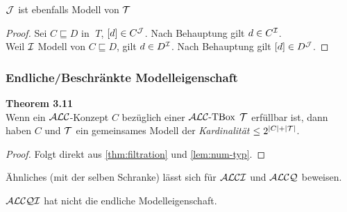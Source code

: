 \begin{tafel}
$\mathcal{J}$ ist ebenfalls Modell von $\mathcal{T}$
\begin{proof}
Sei $C \sqsubseteq D$ in $\;T$, $[d] \in C^{\mathcal{J}}$.
Nach Behauptung gilt $d \in C^{\mathcal{I}}$. \\
Weil $\mathcal{I}$ Modell von $C \sqsubseteq D$, gilt $d \in D^{\mathcal{I}}$.
Nach Behauptung gilt $[d] \in D^{\mathcal{J}}$.
\end{proof}
\end{tafel}

\subsubsection{Endliche/Beschränkte Modelleigenschaft}

\textbf{Theorem 3.11} \\
Wenn ein $\mathcal{A}\mathcal{L}\mathcal{C}$-Konzept $C$ bezüglich einer $\text{$\mathcal{A}\mathcal{L}\mathcal{C}$-TBox}$ $\mathcal{T}$ erfüllbar ist, dann haben $C$ und $\mathcal{T}$ ein gemeinsames Modell der
\emph{Kardinalität} $\leq 2^{\left| C \right| + |\MT|}$.

\begin{proof}
    Folgt direkt aus \autoref{thm:filtration} und \autoref{lem:num-typ}.
\end{proof}

Ähnliches (mit der selben Schranke) lässt sich für $\mathcal{A}\mathcal{L}\mathcal{C}\mathcal{I}$ und $\mathcal{A}\mathcal{L}\mathcal{C}\mathcal{Q}$ beweisen.

\begin{theorem}
$\mathcal{A}\mathcal{L}\mathcal{C}\mathcal{Q}\mathcal{I}$ hat nicht die endliche Modelleigenschaft.
\end{theorem}

